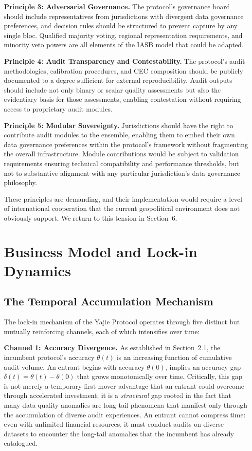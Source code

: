 \documentclass[12pt,a4paper]{ctexart}
\theoremstyle{definition}
\theoremstyle{remark}
\begin{document}
\textbf{Principle 3: Adversarial Governance.} The protocol's governance board should include representatives from jurisdictions with divergent data governance preferences, and decision rules should be structured to prevent capture by any single bloc. Qualified majority voting, regional representation requirements, and minority veto powers are all elements of the IASB model that could be adapted.

\textbf{Principle 4: Audit Transparency and Contestability.} The protocol's audit methodologies, calibration procedures, and CEC composition should be publicly documented to a degree sufficient for external reproducibility. Audit outputs should include not only binary or scalar quality assessments but also the evidentiary basis for those assessments, enabling contestation without requiring access to proprietary audit modules.

\textbf{Principle 5: Modular Sovereignty.} Jurisdictions should have the right to contribute audit modules to the ensemble, enabling them to embed their own data governance preferences within the protocol's framework without fragmenting the overall infrastructure. Module contributions would be subject to validation requirements ensuring technical compatibility and performance thresholds, but not to substantive alignment with any particular jurisdiction's data governance philosophy.

These principles are demanding, and their implementation would require a level of international cooperation that the current geopolitical environment does not obviously support. We return to this tension in Section~6.

\section{Business Model and Lock-in Dynamics}

\subsection{The Temporal Accumulation Mechanism}

The lock-in mechanism of the Yajie Protocol operates through five distinct but mutually reinforcing channels, each of which intensifies over time:

\textbf{Channel 1: Accuracy Divergence.} As established in Section~2.1, the incumbent protocol's accuracy $\theta(t)$ is an increasing function of cumulative audit volume. An entrant begins with accuracy $\theta(0)$, implies an accuracy gap $\delta(t) = \theta(t) - \theta(0)$ that grows monotonically over time. Critically, this gap is not merely a temporary first-mover advantage that an entrant could overcome through accelerated investment; it is a \textit{structural} gap rooted in the fact that many data quality anomalies are long-tail phenomena that manifest only through the accumulation of diverse audit experiences. An entrant cannot compress time: even with unlimited financial resources, it must conduct audits on diverse datasets to encounter the long-tail anomalies that the incumbent has already catalogued.
\end{document}
